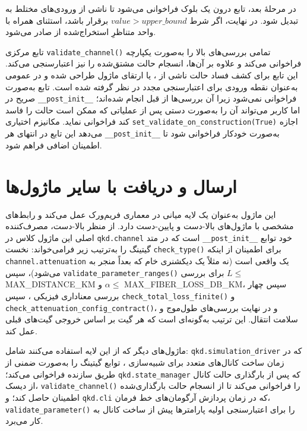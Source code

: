 در مرحلهٔ بعد، تابع  درون یک بلوک  فراخوانی می‌شود تا  ناشی از ورودی‌های مختلط  به  تبدیل شود. در نهایت، اگر شرط $value > upper\_bound$ برقرار باشد، استثنای  همراه با واحد متناظرِ استخراج‌شده از  صادر می‌شود.


تابع مرکزی \texttt{validate\_channel()} تمامی بررسی‌های بالا را به‌صورت یکپارچه فراخوانی می‌کند و علاوه بر آن‌ها، انسجام حالت مشتق‌شده را نیز اعتبارسنجی می‌کند. این تابع برای کشف فساد حالت ناشی از ،  یا ارتقای ماژول  طراحی شده و در  عمومی به‌عنوان نقطه ورودی برای اعتبارسنجی مجدد در نظر گرفته شده است. تابع به‌صورت صریح در \texttt{\_\_post\_init\_\_} فراخوانی نمی‌شود زیرا آن بررسی‌ها از قبل انجام شده‌اند؛ اما کاربر می‌تواند آن را به‌صورت دستی پس از عملیاتی که ممکن است حالت را فاسد کند فراخوانی نماید. مکانیزم اختیاری \texttt{set\_validate\_on\_construction(True)} اجازه می‌دهد این تابع در انتهای هر \texttt{\_\_post\_init\_\_} به‌صورت خودکار فراخوانی شود تا اطمینان اضافی فراهم شود.

\section{ارسال و دریافت با سایر ماژول‌ها}

این ماژول به‌عنوان یک لایه میانی در معماری فریم‌ورک عمل می‌کند و رابط‌های مشخصی با ماژول‌های بالا-دست و پایین-دست دارد. از منظر بالا-دست، مصرف‌کننده اصلی این ماژول کلاس  در \texttt{qkd.channel} است که در متد \texttt{\_\_post\_init\_\_} خود توابع گیتینگ را به‌ترتیب زیر فرامی‌خواند: نخست \texttt{check\_type()} برای اطمینان از اینکه \texttt{channel.attenuation} یک  واقعی است (نه مثلاً یک دیکشنری خام که بعداً منجر به  می‌شود)، سپس \texttt{validate\_parameter\_ranges()} برای بررسی $L \leq$ MAX\_DISTANCE\_KM و $\alpha \leq$ MAX\_FIBER\_LOSS\_DB\_KM، سپس چهار بررسی معناداری فیزیکی ، سپس \texttt{check\_total\_loss\_finite()} و \texttt{check\_attenuation\_config\_contract()}، و در نهایت بررسی‌های طول‌موج و سلامت انتقال. این ترتیب به‌گونه‌ای است که هر گیت بر اساس خروجی گیت‌های قبلی عمل کند.

ماژول‌های دیگر که از این لایه استفاده می‌کنند شامل: \texttt{qkd.simulation\_driver} که در زمان ساخت کانال‌های متعدد برای شبیه‌سازی ، توابع گیتینگ را به‌صورت ضمنی از طریق سازنده  فراخوانی می‌کند؛ \texttt{qkd.state\_manager} که پس از بارگذاری حالت کانال از دیسک، \texttt{validate\_channel()} را فراخوانی می‌کند تا از انسجام حالت بارگذاری‌شده اطمینان حاصل کند؛ و \texttt{qkd.cli} که در زمان پردازش آرگومان‌های خط فرمان، \texttt{validate\_parameter()} را برای اعتبارسنجی اولیه پارامترها پیش از ساخت کانال به کار می‌برد.

